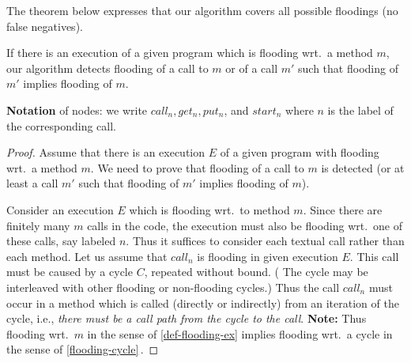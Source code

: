 {The theorem below expresses that our algorithm covers all possible floodings
(no false negatives).

\begin{theorem}
\label{theorem-main}
If there is an execution of a given program which is flooding wrt.\ a method $m$, 
our algorithm detects flooding of a  call to $m$ or of 
a call  $m'$ such that flooding of $m'$ implies flooding of $m$.
\end{theorem}

\textbf{Notation}
of nodes: we write $call_n, get_n, put_n$, and $start_n$
where $n$ is the label of the corresponding call. 


\begin{proof}
Assume that there is an execution $E$ of a given program with flooding
wrt.\ a method $m$.  We need to prove that flooding of a call to $m$
is detected (or at least a call $m'$ such that flooding of $m'$
implies flooding of $m$).


Consider an execution $E$ which is flooding  wrt.\ to method $m$.  Since
there are finitely many $m$ calls in the code, the execution must also
be flooding  wrt.\ one of these calls, say labeled $n$.  Thus it suffices
to consider each textual call rather than each method.  Let us assume
that $call_n$ is flooding in given execution $E$.
This call must be caused by a cycle $C$, repeated without bound.  (%
The cycle may be interleaved with other flooding or non-flooding
cycles.)  Thus the call $call_n$ must occur in a method
which is called (directly or indirectly) from an iteration of  the cycle,
i.e., \emph{there must be a call path from the cycle to the call}.
%
\textbf{Note:}
Thus flooding wrt.\ $m$ in the sense of \ref{def-flooding-ex}  implies 
flooding wrt.\ a cycle in the sense of \ref{flooding-cycle}\,. 



\end{proof}}
